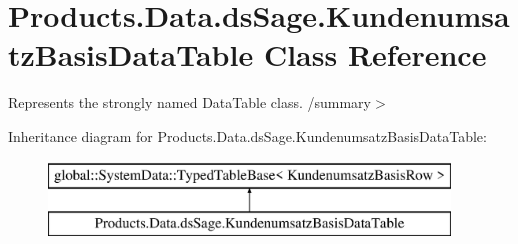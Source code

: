 \hypertarget{class_products_1_1_data_1_1ds_sage_1_1_kundenumsatz_basis_data_table}{}\section{Products.\+Data.\+ds\+Sage.\+Kundenumsatz\+Basis\+Data\+Table Class Reference}
\label{class_products_1_1_data_1_1ds_sage_1_1_kundenumsatz_basis_data_table}


Represents the strongly named Data\+Table class. /summary$>$  


Inheritance diagram for Products.\+Data.\+ds\+Sage.\+Kundenumsatz\+Basis\+Data\+Table\+:\begin{figure}[H]
\begin{center}
\leavevmode
\includegraphics[height=2.000000cm]{class_products_1_1_data_1_1ds_sage_1_1_kundenumsatz_basis_data_table}
\end{center}
\end{figure}
